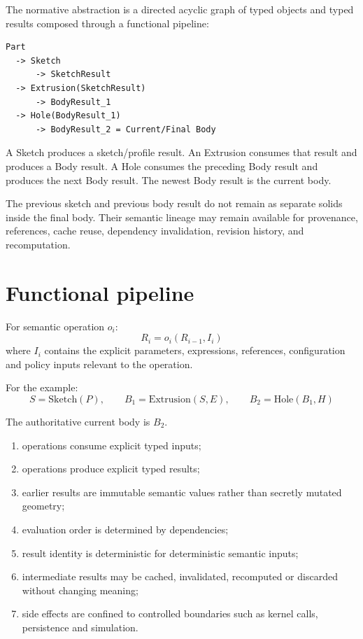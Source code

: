 \documentclass[11pt,a4paper]{report}
\begin{document}
The normative abstraction is a directed acyclic graph of typed objects and typed results composed through a functional pipeline:

\begin{lstlisting}
Part
  -> Sketch
      -> SketchResult
  -> Extrusion(SketchResult)
      -> BodyResult_1
  -> Hole(BodyResult_1)
      -> BodyResult_2 = Current/Final Body
\end{lstlisting}

A Sketch produces a sketch/profile result. An Extrusion consumes that result and produces a Body result. A Hole consumes the preceding Body result and produces the next Body result. The newest Body result is the current body.

The previous sketch and previous body result do not remain as separate solids inside the final body. Their semantic lineage may remain available for provenance, references, cache reuse, dependency invalidation, revision history, and recomputation.

\section{Functional pipeline}

For semantic operation $o_i$:
\[
R_i=o_i(R_{i-1},I_i)
\]
where $I_i$ contains the explicit parameters, expressions, references, configuration and policy inputs relevant to the operation.

For the example:
\[
S=\mathrm{Sketch}(P),\qquad
B_1=\mathrm{Extrusion}(S,E),\qquad
B_2=\mathrm{Hole}(B_1,H)
\]

The authoritative current body is $B_2$.

\begin{enumerate}
\item operations consume explicit typed inputs;
\item operations produce explicit typed results;
\item earlier results are immutable semantic values rather than secretly mutated geometry;
\item evaluation order is determined by dependencies;
\item result identity is deterministic for deterministic semantic inputs;
\item intermediate results may be cached, invalidated, recomputed or discarded without changing meaning;
\item side effects are confined to controlled boundaries such as kernel calls, persistence and simulation.
\end{enumerate}
\end{document}
